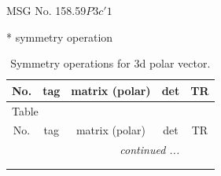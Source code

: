 \documentclass[fleqn,8pt]{jsarticle}
\begin{document}
\setcounter{MaxMatrixCols}{32}

\renewcommand{\tablename}{Table~}
\renewcommand{\figurename}{Figure~}
\begin{center}
\LARGE
MSG No. 158.59\quad$P3c'1$
\end{center}
* symmetry operation
\renewcommand{\arraystretch}{1.3}
\begin{longtable}{ccccc}
\caption{Symmetry operations for 3d polar vector.}
 \\
 \hline \hline
No. & tag & matrix (polar) & det & TR \\ \hline \endfirsthead

\multicolumn{4}{l}{\tablename\ \thetable{}} \\
 \hline \hline
No. & tag & matrix (polar) & det & TR \\ \hline \endhead

 \hline \hline
\multicolumn{4}{r}{\footnotesize\it continued ...} \\ \endfoot

 \hline \hline
\multicolumn{4}{r}{} \\ \endlastfoot


\end{longtable}
\end{document}
